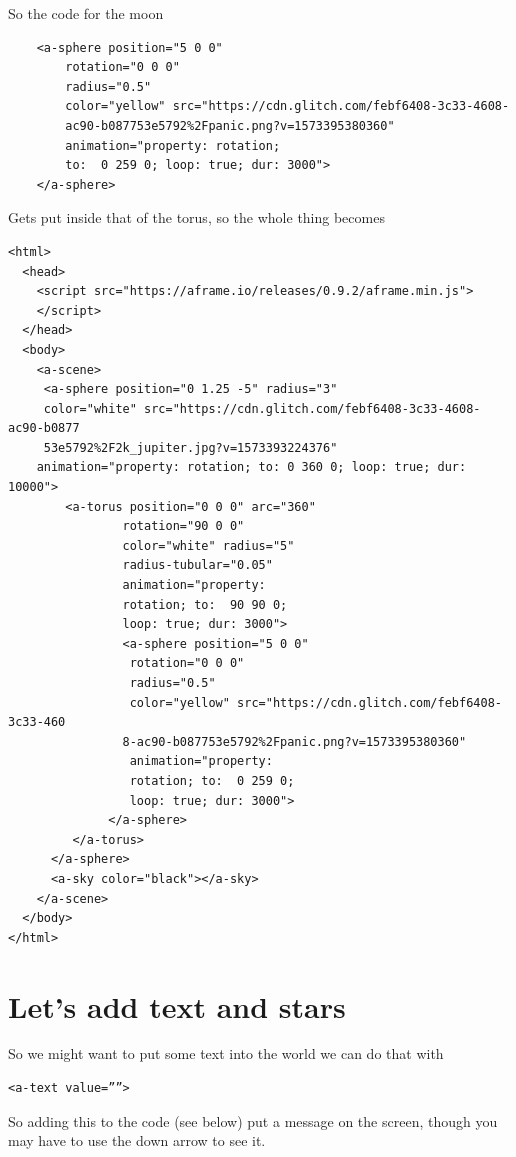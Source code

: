 So the code for the moon
\begin{lstlisting}
    <a-sphere position="5 0 0"
        rotation="0 0 0"
        radius="0.5"
        color="yellow" src="https://cdn.glitch.com/febf6408-3c33-4608-
        ac90-b087753e5792%2Fpanic.png?v=1573395380360"
        animation="property: rotation; 
        to:  0 259 0; loop: true; dur: 3000">
    </a-sphere>
\end{lstlisting}
Gets put inside that of the torus, so the whole thing becomes
\begin{lstlisting}
<html>
  <head>
    <script src="https://aframe.io/releases/0.9.2/aframe.min.js">
    </script>
  </head>
  <body>
    <a-scene>
     <a-sphere position="0 1.25 -5" radius="3" 
     color="white" src="https://cdn.glitch.com/febf6408-3c33-4608-ac90-b0877
     53e5792%2F2k_jupiter.jpg?v=1573393224376"
    animation="property: rotation; to: 0 360 0; loop: true; dur: 10000">
        <a-torus position="0 0 0" arc="360"
                rotation="90 0 0"
                color="white" radius="5"
                radius-tubular="0.05"
                animation="property: 
                rotation; to:  90 90 0; 
                loop: true; dur: 3000">
                <a-sphere position="5 0 0"
                 rotation="0 0 0"
                 radius="0.5"
                 color="yellow" src="https://cdn.glitch.com/febf6408-3c33-460
                8-ac90-b087753e5792%2Fpanic.png?v=1573395380360"
                 animation="property: 
                 rotation; to:  0 259 0; 
                 loop: true; dur: 3000">
              </a-sphere>
         </a-torus>
      </a-sphere>   
      <a-sky color="black"></a-sky>
    </a-scene>
  </body>
</html>               
\end{lstlisting}

\section{Let's add text and stars}
So we might want to put some text into the world we can do that with
\begin{lstlisting}
<a-text value=””>
\end{lstlisting} 

So adding this to the code (see below) put a message on the screen, though you may have to use the down arrow to see it.

